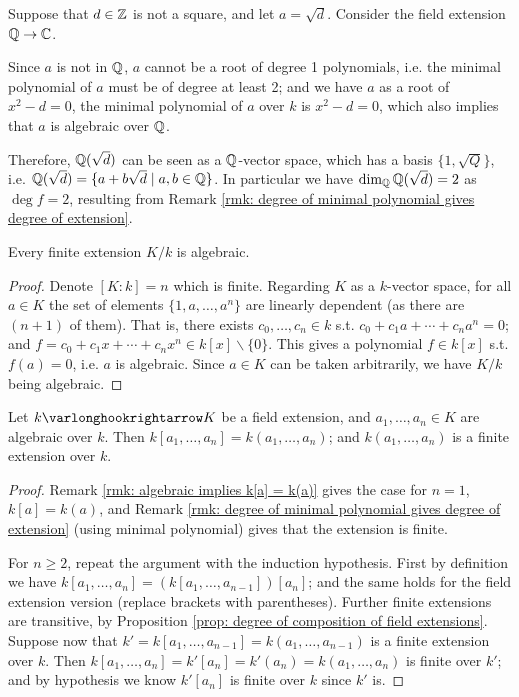 \begin{example}
    Suppose that $d \in \mathbb{Z}$ is not a square, and let $a = \sqrt{d}$. Consider the field extension $\mathbb{Q} \to \mathbb{C}$.
    
    Since $a$ is not in $\mathbb{Q}$, $a$ cannot be a root of degree 1 polynomials, i.e. the minimal polynomial of $a$ must be of degree at least 2; and we have $a$ as a root of $x^2 - d = 0$, the minimal polynomial of $a$ over $k$ is $x^2 - d = 0$, which also implies that $a$ is algebraic over $\mathbb{Q}$.

    Therefore, $\mathbb{Q}(\sqrt{d})$ can be seen as a $\mathbb{Q}$-vector space, which has a basis $\{1, \sqrt{Q}\}$, i.e. $\mathbb{Q}(\sqrt{d}) = \{ a + b \sqrt{d} \mid a, b \in \mathbb{Q} \}$. In particular we have $\dim_{\mathbb{Q}} \mathbb{Q}(\sqrt{d}) = 2$ as $\deg f = 2$, resulting from Remark \ref{rmk: degree of minimal polynomial gives degree of extension}.
\end{example}

\begin{proposition}\label{prop: finite extensions are algebraic}
    Every finite extension $K/k$ is algebraic. 
\end{proposition}

\begin{proof}
    Denote $[K : k] = n$ which is finite. Regarding $K$ as a $k$-vector space, for all $a \in K$ the set of elements $\{ 1, a, \dots, a^n \}$ are linearly dependent (as there are $(n+1)$ of them). That is, there exists $c_0, \dots, c_n \in k$ s.t. $c_0 + c_1 a + \cdots + c_n a^n = 0$; and $f = c_0 + c_1 x + \cdots + c_n x^n \in k[x] \smallsetminus \{0\}$. This gives a polynomial $f \in k[x]$ s.t. $f(a) = 0$, i.e. $a$ is algebraic. Since $a \in K$ can be taken arbitrarily, we have $K/k$ being algebraic. 
\end{proof}

\begin{proposition}\label{prop: finitely generated algebraic extensions are finite}
    Let $k \ext K$ be a field extension, and $a_1, \dots, a_n \in K$ are algebraic over $k$. Then $k[a_1, \dots, a_n] = k(a_1, \dots, a_n)$; and $k(a_1, \dots, a_n)$ is a finite extension over $k$. 
\end{proposition}

\begin{proof}
    Remark \ref{rmk: algebraic implies k[a] = k(a)} gives the case for $n = 1$, $k[a] = k(a)$, and Remark \ref{rmk: degree of minimal polynomial gives degree of extension} (using minimal polynomial) gives that the extension is finite. 

    For $n \geq 2$, repeat the argument with the induction hypothesis. First by definition we have $k[a_1, \dots, a_n] = (k[a_1, \dots, a_{n-1}]) [a_n]$; and the same holds for the field extension version (replace brackets with parentheses). Further finite extensions are transitive, by Proposition \ref{prop: degree of composition of field extensions}. Suppose now that $k' = k[a_1, \dots, a_{n-1}] = k(a_1, \dots, a_{n-1})$ is a finite extension over $k$. Then $k[a_1, \dots, a_n] = k'[a_n] = k'(a_n) = k(a_1, \dots, a_n)$ is finite over $k'$; and by hypothesis we know $k'[a_n]$ is finite over $k$ since $k'$ is. 
\end{proof}

